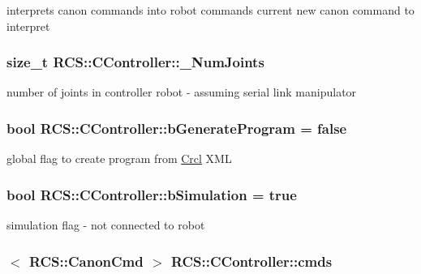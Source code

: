 interprets canon commands into robot commands current new canon command to interpret \hypertarget{structRCS_1_1CController_a9b155c29a4fbb8b1a36dada1417126ff}{
\subsubsection[{\-\_\-\-Num\-Joints}]{\setlength{\rightskip}{0pt plus 5cm}size\-\_\-t R\-C\-S\-::\-C\-Controller\-::\-\_\-\-Num\-Joints\hspace{0.3cm}{\ttfamily [static]}}}\label{structRCS_1_1CController_a9b155c29a4fbb8b1a36dada1417126ff}
number of joints in controller robot -\/ assuming serial link manipulator \hypertarget{structRCS_1_1CController_a5b5e83348fbf18e362a59a2d96668466}{
\subsubsection[{b\-Generate\-Program}]{\setlength{\rightskip}{0pt plus 5cm}bool R\-C\-S\-::\-C\-Controller\-::b\-Generate\-Program = false\hspace{0.3cm}{\ttfamily [static]}}}\label{structRCS_1_1CController_a5b5e83348fbf18e362a59a2d96668466}
global flag to create program from \hyperlink{namespaceCrcl}{Crcl} X\-M\-L \hypertarget{structRCS_1_1CController_a5cc727cd1f880d16be6f34d501e06ef0}{
\subsubsection[{b\-Simulation}]{\setlength{\rightskip}{0pt plus 5cm}bool R\-C\-S\-::\-C\-Controller\-::b\-Simulation = true\hspace{0.3cm}{\ttfamily [static]}}}\label{structRCS_1_1CController_a5cc727cd1f880d16be6f34d501e06ef0}
simulation flag -\/ not connected to robot \hypertarget{structRCS_1_1CController_adceba05ebd7fa94f93c131db84840d29}{
\subsubsection[{cmds}]{$<$ {\bf R\-C\-S\-::\-Canon\-Cmd} $>$ R\-C\-S\-::\-C\-Controller\-::cmds\hspace{0.3cm}{\ttfamily [static]}}}\label{structRCS_1_1CController_adceba05ebd7fa94f93c131db84840d29}

